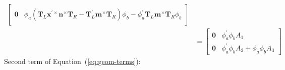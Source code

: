 \begin{equation*}
\begin{aligned}
\begin{bmatrix}
      \mathbf{0} & \phi_a( \mathbf{T}_{\scriptscriptstyle{L}} \bm{x}^{\prime\times} \bm{n}^\times \mathbf{T}_{\scriptscriptstyle{R}}
           -  \mathbf{T}^{\prime}_{\scriptscriptstyle{L}} \bm{m}^\times \mathbf{T}_{\scriptscriptstyle{R}}) \phi_b
           - \phi_a^\prime\mathbf{T}_{\scriptscriptstyle{L}} \bm{m}^\times \mathbf{T}_{\scriptscriptstyle{R}} \phi_b 
    \end{bmatrix} \\
   &=\begin{bmatrix}
   \mathbf{0} & \phi_a^\prime \phi_b A_1\\
   \mathbf{0} & \phi_a^\prime \phi_b A_2
          + \phi_a  \phi_b       A_3
   \end{bmatrix}
   \end{aligned}
\end{equation*}
%
Second term of Equation~(\ref{eq:geom-terms}): %
